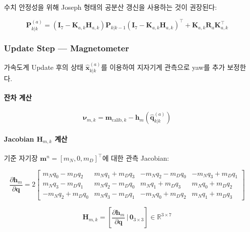 수치 안정성을 위해 Joseph 형태의 공분산 갱신을 사용하는 것이 권장된다:

\begin{equation}
    \mathbf{P}_{k|k}^{(a)} = \left(\mathbf{I}_7 - \mathbf{K}_{a,k}\mathbf{H}_{a,k}\right)\mathbf{P}_{k|k-1}\left(\mathbf{I}_7 - \mathbf{K}_{a,k}\mathbf{H}_{a,k}\right)^\top + \mathbf{K}_{a,k}\mathbf{R}_a\mathbf{K}_{a,k}^\top
    \label{eq:ekf_joseph}
\end{equation}

\subsubsection{Update Step — Magnetometer}

가속도계 Update 후의 상태 $\hat{\mathbf{x}}_{k|k}^{(a)}$를 이용하여
지자기계 관측으로 yaw를 추가 보정한다.

\paragraph{잔차 계산}

\begin{equation}
    \boldsymbol{\nu}_{m,k} = \mathbf{m}_{\text{calib},k} - \mathbf{h}_m\!\left(\hat{\mathbf{q}}_{k|k}^{(a)}\right)
    \label{eq:ekf_mag_innovation}
\end{equation}

\paragraph{Jacobian $\mathbf{H}_{m,k}$ 계산}

기준 자기장 $\mathbf{m}^n = [m_N, 0, m_D]^\top$에 대한 관측 Jacobian:

\begin{equation}
    \frac{\partial \mathbf{h}_m}{\partial \mathbf{q}} = 2\begin{bmatrix}
        m_N q_0 - m_D q_2 & m_N q_1 + m_D q_3 & -m_N q_2 - m_D q_0 & -m_N q_3 + m_D q_1 \\
        m_N q_3 - m_D q_1 & m_N q_2 - m_D q_0 &  m_N q_1 + m_D q_3 &  m_N q_0 + m_D q_2 \\   %
       -m_N q_2 + m_D q_0 & m_N q_3 - m_D q_1 & -m_N q_0 + m_D q_2 &  m_N q_1 + m_D q_3
    \end{bmatrix}
    \label{eq:ekf_Hm_quat}
\end{equation}

\begin{equation}
    \mathbf{H}_{m,k} = \left[\frac{\partial \mathbf{h}_m}{\partial \mathbf{q}}\,\Bigg|\, \mathbf{0}_{3\times 3}\right] \in \mathbb{R}^{3\times 7}
    \label{eq:ekf_Hm}
\end{equation}

